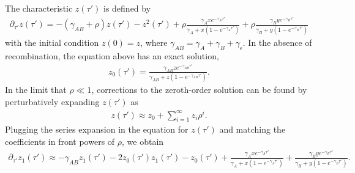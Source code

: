 \documentclass[11pt]{article}
\begin{document}
The characteristic $z(\tau')$ is defined by 
\begin{align}\label{eq:z_general_eq}
    \partial_{\tau'} z(\tau') = -(\gamma_{AB} + \rho) z(\tau') - z^2(\tau') + \rho \frac{\gamma_Axe^{-\gamma_A\tau'}}{\gamma_A+x(1-e^{-\gamma_A\tau'})} + \rho \frac{\gamma_Bye^{-\gamma_B\tau'}}{\gamma_B+y(1-e^{-\gamma_B\tau'})}
\end{align}
with the initial condition $z(0)=z$, where $\gamma_{AB} = \gamma_A + \gamma_B + \gamma_{\epsilon}$. In the absence of recombination, the equation above has an exact solution, 
\begin{align}
    z_0(\tau') = \frac{\gamma_{AB}ze^{-\gamma_{AB}\tau'}}{\gamma_{AB}+z(1-e^{-\gamma_{AB}\tau'})}.
\end{align}
In the limit that $\rho \ll 1$, corrections to the zeroth-order solution can be found by perturbatively expanding $z(\tau')$ as
\begin{align}\label{eq:z_series}
    z(\tau') \approx z_0 + \sum_{i=1}^{\infty} z_i\rho^{i}.
\end{align}
Plugging the series expansion in the equation for $z(\tau')$ and matching the coefficients in front powers of $\rho$, we obtain 
\begin{align}
        \partial_{\tau'}z_1(\tau') \approx -\gamma_{AB}z_1(\tau') -2z_0(\tau')z_1(\tau') - z_0(\tau') + \frac{\gamma_Axe^{-\gamma_A\tau'}}{\gamma_A+x(1-e^{-\gamma_A\tau'})} + \frac{\gamma_Bye^{-\gamma_B\tau'}}{\gamma_B+y(1-e^{-\gamma_B\tau'})}.
\end{align}
\end{document}
